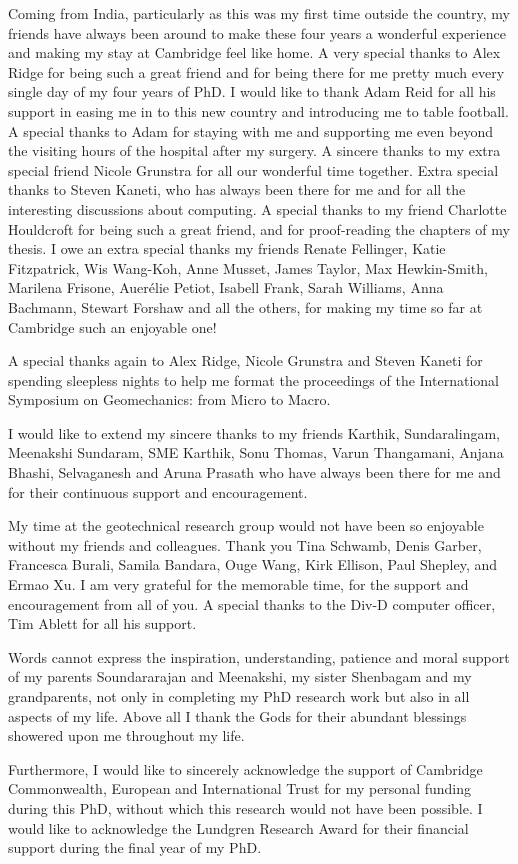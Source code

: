 \begin{acknowledgements}
Coming from India, particularly as this was my first time outside the country, 
my friends have always been around to make these four years a wonderful 
experience and making my stay at Cambridge feel like home. A very special 
thanks to Alex Ridge for being such a great friend 
and for being there for me pretty much every single day of my four years of 
PhD. I would like to thank Adam Reid for all his support in easing me in to 
this new country and introducing me to table football. A special thanks to Adam 
for staying with me and supporting me even beyond the visiting hours of the 
hospital after my surgery. A sincere thanks to my extra special friend Nicole 
Grunstra for all our wonderful time together. Extra special thanks to Steven 
Kaneti, who has always been there for me and for all the interesting 
discussions about computing. A special thanks to my friend Charlotte Houldcroft 
for being such a great friend, and for proof-reading the chapters of my thesis. 
I owe an extra special thanks my friends Renate Fellinger, Katie Fitzpatrick, 
Wis Wang-Koh, Anne Musset, James Taylor, Max Hewkin-Smith, Marilena Frisone, 
Auer\'{e}lie Petiot, Isabell Frank, Sarah Williams, Anna Bachmann, Stewart 
Forshaw and all the others, for making my time so far at Cambridge such an 
enjoyable one!

A special thanks again to Alex Ridge, Nicole Grunstra and Steven Kaneti for 
spending sleepless nights to help me format the proceedings of the 
International Symposium on Geomechanics: from Micro to Macro. 

I would like to extend my sincere thanks to my friends Karthik, 
Sundaralingam, Meenakshi Sundaram, SME Karthik, Sonu Thomas, Varun Thangamani, 
Anjana Bhashi,  Selvaganesh and Aruna Prasath who have always been there for 
me and for their continuous support and encouragement.

My time at the geotechnical research group would not have been so enjoyable 
without my friends and colleagues. Thank you Tina Schwamb, Denis Garber,
Francesca Burali, Samila Bandara, Ouge Wang, Kirk Ellison, Paul 
Shepley, and Ermao Xu. I am very grateful for the memorable time, 
for the support and encouragement from all of you. A special thanks to the 
Div-D computer officer, Tim Ablett for all his support.

Words cannot express the inspiration, understanding, patience and moral support 
of my parents Soundararajan and Meenakshi, my sister Shenbagam and my 
grandparents, not only in completing my PhD research work but also in all 
aspects of my life. Above all I thank the Gods for their abundant blessings 
showered upon me throughout my life.

Furthermore, I would like to sincerely acknowledge the support of Cambridge 
Commonwealth, European and International Trust for my personal funding during 
this PhD, without which this research would not have been possible. I would 
like to acknowledge the Lundgren Research Award for their financial support 
during the final year of my PhD.

\end{acknowledgements}
